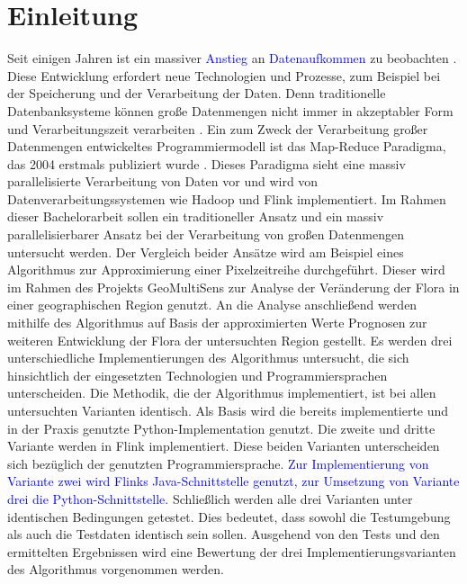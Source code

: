 \chapter{Einleitung}
Seit einigen Jahren ist ein massiver \textcolor{blue}{Anstieg} an \textcolor{blue}{Datenaufkommen} zu beobachten \cite{EMC2014}. Diese Entwicklung erfordert neue Technologien und Prozesse, zum Beispiel bei der Speicherung und der Verarbeitung der Daten. Denn traditionelle Datenbanksysteme können große Datenmengen nicht immer in akzeptabler Form und Verarbeitungszeit verarbeiten \cite{Jacobs2009}. Ein zum Zweck der Verarbeitung großer Datenmengen entwickeltes Programmiermodell ist das Map-Reduce Paradigma, das 2004 erstmals publiziert wurde \cite{Dean2008}. Dieses Paradigma sieht eine massiv parallelisierte Verarbeitung von Daten vor und wird von Datenverarbeitungssystemen wie Hadoop \cite{HadoopWebsite} und Flink \cite{FlinkWebsite} implementiert.
\newline
Im Rahmen dieser Bachelorarbeit sollen ein traditioneller Ansatz und ein massiv parallelisierbarer Ansatz bei der Verarbeitung von großen Datenmengen untersucht werden. Der Vergleich beider Ansätze wird am Beispiel eines Algorithmus zur Approximierung einer Pixelzeitreihe durchgeführt. Dieser wird im Rahmen des Projekts GeoMultiSens %
 zur Analyse der Veränderung der Flora in einer geographischen Region genutzt. An die Analyse anschließend werden mithilfe des Algorithmus auf Basis der approximierten Werte Prognosen zur weiteren Entwicklung der Flora der untersuchten Region gestellt.
\newline
Es werden drei unterschiedliche Implementierungen des Algorithmus untersucht, die sich hinsichtlich der eingesetzten Technologien und Programmiersprachen unterscheiden. Die Methodik, die der Algorithmus implementiert, ist bei allen untersuchten Varianten identisch. Als Basis wird die bereits implementierte und in der Praxis genutzte Python-Implementation genutzt. Die zweite und dritte Variante werden in Flink implementiert. Diese beiden Varianten unterscheiden sich bezüglich der genutzten Programmiersprache. \textcolor{blue}{Zur Implementierung von Variante zwei wird Flinks Java-Schnittstelle genutzt, zur Umsetzung von Variante drei die Python-Schnittstelle.} Schließlich werden alle drei Varianten unter identischen Bedingungen getestet. Dies bedeutet, dass sowohl die Testumgebung als auch die Testdaten identisch sein sollen. Ausgehend von den Tests und den ermittelten Ergebnissen wird eine Bewertung der drei Implementierungsvarianten des Algorithmus vorgenommen werden.

